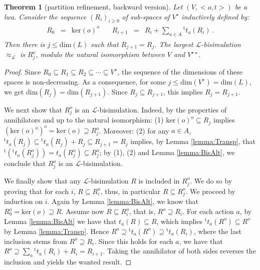\documentclass[3p]{elsarticle}
\newcommand{\fL}{\mathcal{L}}    %
\newcommand{\dimn}{\mathrm{dim}}   %
\newcommand{\transp}{{}^{\mathrm{t}}}  %
\newcommand{\dual}[1]{ {#1}^\star}     %
\newcommand{\ddual}[1]{{#1}^{\star\star}}  %
\newcommand{\ann}{o}                    %
\newcommand{\kernel}{\mathrm{ker}} %
\newcommand{\lwa}{{\sc lwa}}           %
\newcommand{\R}{R}%
\newtheorem{theorem}{Theorem}
\begin{document}
\begin{theorem}[partition refinement, backward version]\label{Th:Largest}%
Let $(V,<o,t>)$
be a \lwa. Consider the sequence $(\R_i)_{i\geq 0}$ of sub-spaces of $\dual V$ inductively defined by:
\begin{eqnarray}\label{eq:Back}
\begin{array}{rclrcl}
\R_0 & = & \kernel(o)^\ann &\quad \R_{i+1} & = &\R_i + \sum_{a\in
A}\transp t_a (\R_i)\,.
\end{array}
\end{eqnarray}
Then there is $j\leq \dimn(L)$ such that $\R_{j+1}=\R_j$. The
largest $\fL$-bisimulation $\approx_\fL$ is  $\R_j^\ann$, modulo the
natural isomorphism between $V$ and $\ddual V$.
\end{theorem}
\begin{proof}
Since $\R_0\subseteq \R_1\subseteq \R_2\subseteq\cdots\subseteq \dual V$, the sequence of the dimensions of these spaces  is non-decreasing. As a consequence, for some $j\leq \dimn(\dual V)=\dimn(L)$, we get $\dimn(\R_j)=\dimn(\R_{j+1})$. Since $\R_j\subseteq \R_{j+1}$, this implies $\R_j= \R_{j+1}$.

We next show that $\R_j^\ann$ is an $\fL$-bisimulation. Indeed, by
the properties of annihilators and up  to the natural isomorphism:
(1) $\kernel(o)^\ann\subseteq \R_j$ implies
$(\kernel(o)^\ann)^\ann=\kernel(o)\supseteq \R_j^\ann$. Moreover:
(2) for any $a\in A$, $\transp t_a(\R_j)\subseteq \transp
t_a(\R_j)+\R_j\subseteq \R_{j+1}=\R_j$ implies, by Lemma
\ref{lemma:Transp}, that $\transp(\transp
t_a(\R_j^\ann))=t_a(\R_j^\ann)\subseteq\R_j^\ann$; by (1), (2) and
Lemma \ref{lemma:BisAlt}, we conclude that $\R_j^\ann$ is an
$\fL$-bisimulation.

We finally show that any  $\fL$-bisimulation $R$ is included in
$\R_j^\ann$. We do so by proving that for each $i$,
$R\subseteq \R_i^\ann$, thus, in particular $R\subseteq \R_j^\ann$.
We proceed by induction on $i$. Again by Lemma \ref{lemma:BisAlt},
we know that $\R_0^\ann=\kernel(o)\supseteq R$. Assume now
$R\subseteq \R_i^\ann$, that is,   $R^\ann\supseteq \R_i$. For each
action $a$,  by Lemma \ref{lemma:BisAlt} we have that
$t_a(R)\subseteq R$, which implies $\transp t_a(R^\ann)\subseteq
R^\ann$ by Lemma \ref{lemma:Transp}. Hence
 $R^\ann\supseteq  \transp t_a(R^\ann)\supseteq \transp t_a(R_i)$,
 where the last inclusion stems from $R^\ann\supseteq \R_i$.
 Since this holds for each $a$, we have that
 $R^\ann\supseteq \sum_a  \transp t_a(R_i) + R_i = R_{i+1}$.
  Taking the annihilator of both sides reverses the inclusion and yields  the wanted result.
\end{proof}
\end{document}
